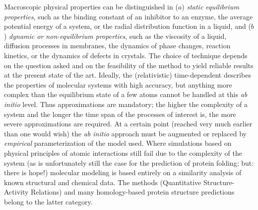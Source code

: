 Macroscopic physical properties can be distinguished in ($a$) {\em static 
equilibrium properties}, such as the binding constant  of an inhibitor to an 
enzyme, the average potential energy of a system, or the radial distribution  
function in a liquid, and ($b$) {\em
dynamic or non-equilibrium properties}, such as the viscosity of a 
liquid, diffusion processes in membranes, the dynamics of phase 
changes, reaction kinetics, or the dynamics of defects in crystals.  
The choice of technique depends on the question asked and on the 
feasibility of the method to yield reliable results at the present 
state of the art. Ideally, the (relativistic) time-dependent 
describes the properties of molecular systems 
with high accuracy, but anything more complex than the equilibrium 
state of a few atoms cannot be handled at this {\em ab initio} level. 
Thus approximations are mandatory; the higher the complexity of a 
system and the longer the time span of the processes of interest is, 
the more severe approximations are required. At a certain point 
(reached very much earlier than one would wish) the {\em ab initio} 
approach must be augmented or replaced by {\em empirical} 
parameterization of the model used. Where simulations based on physical 
principles of atomic interactions still fail  due to the complexity of the 
system (as is unfortunately 
still the case for the prediction of protein folding; but: there is hope!) 
molecular modeling is based entirely on a similarity analysis of known 
structural and chemical data. The  methods (Quantitative 
Structure-Activity Relations) and many homology-based protein structure  
predictions belong to the latter category.

